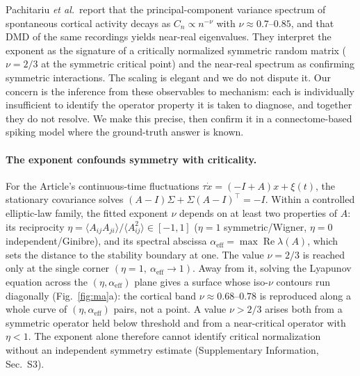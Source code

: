 \documentclass[pdflatex,sn-nature]{sn-jnl}
\newcommand{\alphaeff}{\alpha_{\mathrm{eff}}}
\begin{document}
Pachitariu \emph{et al.}\ report that the principal-component variance spectrum
of spontaneous cortical activity decays as $C_n\propto n^{-\nu}$ with
$\nu\approx 0.7$--$0.85$, and that DMD of the same recordings yields near-real
eigenvalues\cite{pachitariu2026}. They interpret the exponent as the signature of
a critically normalized symmetric random matrix ($\nu=2/3$ at the symmetric
critical point) and the near-real spectrum as confirming symmetric interactions.
The scaling is elegant and we do not dispute it. Our concern is the inference
from these observables to mechanism: each is individually insufficient to
identify the operator property it is taken to diagnose, and together they do not
resolve. We make this precise, then confirm it in a connectome-based spiking
model where the ground-truth answer is known.

\paragraph{The exponent confounds symmetry with criticality.}
For the Article's continuous-time fluctuations $\tau\dot x=(-I+A)x+\xi(t)$, the
stationary covariance solves $(A-I)\Sigma+\Sigma(A-I)^\top=-I$. Within a
controlled elliptic-law family, the fitted exponent $\nu$ depends on at least two
properties of $A$: its reciprocity
$\eta=\langle A_{ij}A_{ji}\rangle/\langle A_{ij}^2\rangle\in[-1,1]$ ($\eta=1$
symmetric/Wigner, $\eta=0$ independent/Ginibre)\cite{sommers1988}, and its
spectral abscissa $\alphaeff=\max\operatorname{Re}\lambda(A)$, which sets the
distance to the stability boundary at one. The value $\nu=2/3$ is reached only at
the single corner $(\eta=1,\ \alphaeff\to1)$\cite{wigner1958,sompolinsky1988,
rajan2006}. Away from it, solving the Lyapunov equation across the
$(\eta,\alphaeff)$ plane gives a surface whose iso-$\nu$ contours run diagonally
(Fig.~\ref{fig:ma}a): the cortical band $\nu\approx 0.68$--$0.78$ is reproduced
along a whole curve of $(\eta,\alphaeff)$ pairs, not a point. A value $\nu>2/3$
arises both from a symmetric operator held below threshold and from a
near-critical operator with $\eta<1$. The exponent alone therefore cannot
identify critical normalization without an independent symmetry estimate
(Supplementary Information, Sec.~S3).
\end{document}

